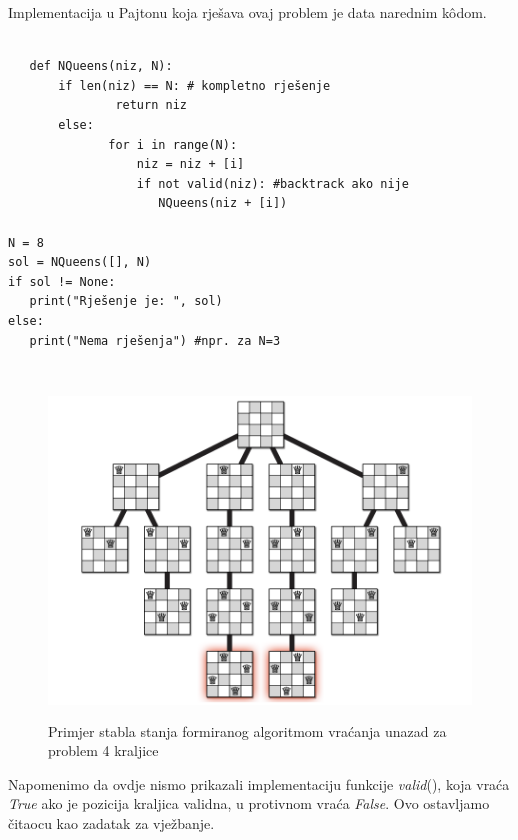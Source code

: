\begin{solution}
   
Implementacija u Pajtonu koja rješava ovaj problem je data narednim k\^odom. 

\begin{verbatim}
	
   def NQueens(niz, N):
       if len(niz) == N: # kompletno rješenje
               return niz
       else:
              for i in range(N):
                  niz = niz + [i]
                  if not valid(niz): #backtrack ako nije 
                     NQueens(niz + [i])

N = 8
sol = NQueens([], N)       
if sol != None:
   print("Rješenje je: ", sol)
else:
   print("Nema rješenja") #npr. za N=3
   
\end{verbatim}
\begin{figure}
	\centering
	\includegraphics[width=320pt, height=250pt]{slike/recursion-tree-backtracking-n-queens.png}
	\caption{Primjer stabla stanja formiranog algoritmom vraćanja unazad za problem 4 kraljice}
\end{figure}

Napomenimo da ovdje nismo prikazali implementaciju funkcije \textit{valid}(), koja vraća \textit{True} ako je pozicija kraljica  validna, u protivnom vraća \textit{False}. Ovo ostavljamo čitaocu kao zadatak za vježbanje. 


\end{solution}


    


